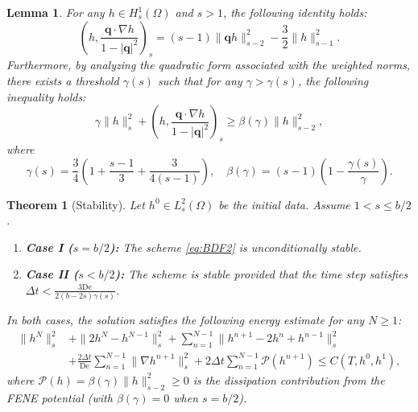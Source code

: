 \documentclass[10pt,a4paper]{amsart}
\newtheorem{lemma}{Lemma}
\newtheorem{theorem}{Theorem}
\begin{document}
\begin{lemma}
\label{lem:Shen_identity}
For any $h \in H_s^1(\Omega)$ and $s > 1$, the following identity holds:
\begin{equation} \label{eq:identity}
    \left(h, \frac{\bm{q}\cdot \nabla h}{1-|\bm{q}|^2}\right)_s = (s-1)\|\bm{q}h\|_{s-2}^2 - \frac{3}{2}\|h\|_{s-1}^2.
\end{equation}
Furthermore, by analyzing the quadratic form associated with the weighted norms, there exists a threshold $\gamma(s)$ such that for any $\gamma > \gamma(s)$, the following inequality holds:
\begin{equation} \label{eq:positivity}
    \gamma \|h\|_s^2 + \left(h, \frac{\bm{q}\cdot \nabla h}{1-|\bm{q}|^2}\right)_s \ge \beta(\gamma)\|h\|_{s-2}^2,
\end{equation}
where 
\begin{equation}
    \gamma(s) = \frac{3}{4}\left(1 + \frac{s-1}{3} + \frac{3}{4(s-1)}\right), \quad \beta(\gamma) = (s-1)\left(1 - \frac{\gamma(s)}{\gamma}\right).
\end{equation}
\end{lemma}

\begin{theorem}[Stability]
\label{thm:stability}
Let $h^0 \in L^2_s(\Omega)$ be the initial data. Assume $1 < s \le b/2$. 
\begin{enumerate}
    \item \textbf{Case I ($s = b/2$):} The scheme \eqref{eq:BDF2} is unconditionally stable.
    \item \textbf{Case II ($s < b/2$):} The scheme is stable provided that the time step satisfies $\Delta t < \frac{3\mathrm{De}}{2(b-2s)\gamma(s)}$.
\end{enumerate}
In both cases, the solution satisfies the following energy estimate for any $N \ge 1$:
\begin{equation}
\begin{aligned}
    \|h^N\|_s^2 &+ \|2h^N - h^{N-1}\|_s^2 + \sum_{n=1}^{N-1} \|h^{n+1} - 2h^n + h^{n-1}\|_s^2 \\
    &+ \frac{2\Delta t}{\text{De}} \sum_{n=1}^{N-1} \|\nabla h^{n+1}\|_s^2 + 2\Delta t \sum_{n=1}^{N-1} \mathcal{P}(h^{n+1}) \le C(T, h^0, h^1),
\end{aligned}
\end{equation}
where $\mathcal{P}(h) = \beta(\gamma)\|h\|_{s-2}^2 \ge 0$ is the dissipation contribution from the FENE potential (with $\beta(\gamma)=0$ when $s=b/2$).
\end{theorem}
\end{document}
